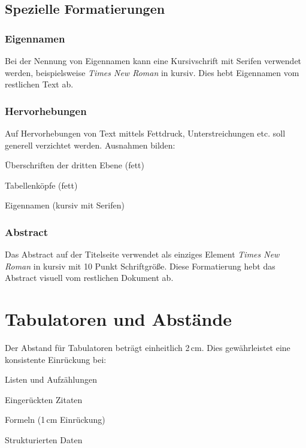 \subsection*{Spezielle Formatierungen}
\label{subsec:spezielle_formatierungen}

\subsubsection{Eigennamen}
Bei der Nennung von Eigennamen kann eine Kursivschrift mit Serifen verwendet werden, beispielsweise \emph{Times New Roman} in kursiv. Dies hebt Eigennamen vom restlichen Text ab.

\subsubsection{Hervorhebungen}
Auf Hervorhebungen von Text mittels Fettdruck, Unterstreichungen etc. soll generell verzichtet werden. Ausnahmen bilden:
\begin{listenabsatz}
	\item Überschriften der dritten Ebene (fett)
	\item Tabellenköpfe (fett)
	\item Eigennamen (kursiv mit Serifen)
\end{listenabsatz}

\subsubsection{Abstract}
Das Abstract auf der Titelseite verwendet als einziges Element \emph{Times New Roman} in kursiv mit 10 Punkt Schriftgröße. Diese Formatierung hebt das Abstract visuell vom restlichen Dokument ab.

\section{Tabulatoren und Abstände}
\label{sec:tabulatoren}

Der Abstand für Tabulatoren beträgt einheitlich 2\,cm. Dies gewährleistet eine konsistente Einrückung bei:
\begin{listenabsatz}
	\item Listen und Aufzählungen
	\item Eingerückten Zitaten
	\item Formeln (1\,cm Einrückung)
	\item Strukturierten Daten
\end{listenabsatz}

